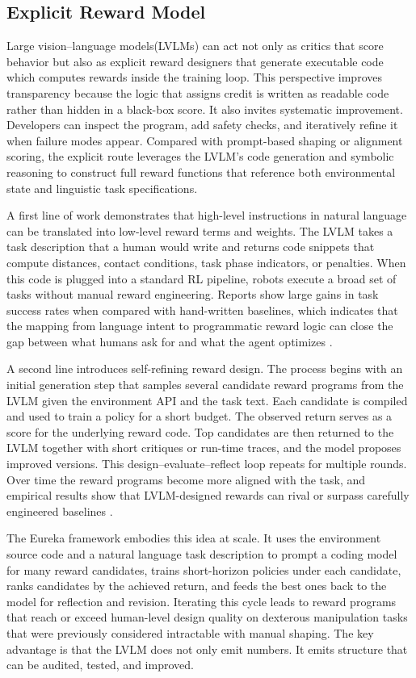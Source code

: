 \documentclass[master,english,final]{kaist-ucs}
\begin{document}
\subsection{Explicit Reward Model}
Large vision–language models(LVLMs) can act not only as critics that score behavior but also as explicit reward designers that generate executable code which computes rewards inside the training loop. This perspective improves transparency because the logic that assigns credit is written as readable code rather than hidden in a black-box score. It also invites systematic improvement. Developers can inspect the program, add safety checks, and iteratively refine it when failure modes appear. Compared with prompt-based shaping or alignment scoring, the explicit route leverages the LVLM’s code generation and symbolic reasoning to construct full reward functions that reference both environmental state and linguistic task specifications.

A first line of work demonstrates that high-level instructions in natural language can be translated into low-level reward terms and weights. The LVLM takes a task description that a human would write and returns code snippets that compute distances, contact conditions, task phase indicators, or penalties. When this code is plugged into a standard RL pipeline, robots execute a broad set of tasks without manual reward engineering. Reports show large gains in task success rates when compared with hand-written baselines, which indicates that the mapping from language intent to programmatic reward logic can close the gap between what humans ask for and what the agent optimizes \cite{yu2023language}.

A second line introduces self-refining reward design. The process begins with an initial generation step that samples several candidate reward programs from the LVLM given the environment API and the task text. Each candidate is compiled and used to train a policy for a short budget. The observed return serves as a score for the underlying reward code. Top candidates are then returned to the LVLM together with short critiques or run-time traces, and the model proposes improved versions. This design–evaluate–reflect loop repeats for multiple rounds. Over time the reward programs become more aligned with the task, and empirical results show that LVLM-designed rewards can rival or surpass carefully engineered baselines \cite{madaan2023self, song2023self}.

The Eureka\cite{ma2023eureka} framework embodies this idea at scale. It uses the environment source code and a natural language task description to prompt a coding model for many reward candidates, trains short-horizon policies under each candidate, ranks candidates by the achieved return, and feeds the best ones back to the model for reflection and revision. Iterating this cycle leads to reward programs that reach or exceed human-level design quality on dexterous manipulation tasks that were previously considered intractable with manual shaping\cite{ma2023eureka}. The key advantage is that the LVLM does not only emit numbers. It emits structure that can be audited, tested, and improved.
\end{document}
